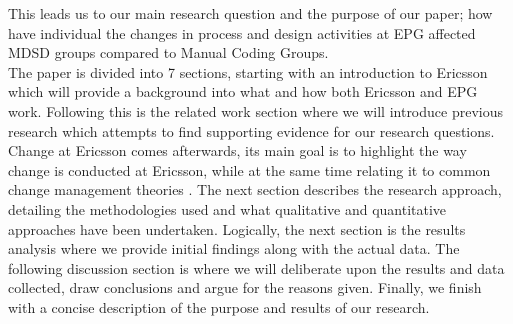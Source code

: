 \documentclass[fina_report_innit.tex]{subfiles}
\begin{document}
This leads us to our main research question and the purpose of our paper; how have individual the changes in process and design activities at EPG affected MDSD groups compared to Manual Coding Groups.
\\

The paper is divided into 7 sections, starting with an introduction to Ericsson which will provide a background into what and how both Ericsson and EPG work. Following this is the related work section where we will introduce previous research which attempts to find supporting evidence for our research questions. Change at Ericsson comes afterwards, its main goal is to highlight the way change is conducted at Ericsson, while at the same time relating it to common change management theories \cite{kotter1995leading} \cite{mintzberg1985strategies}. The next section describes the research approach, detailing the methodologies used and what qualitative and quantitative approaches have been undertaken. Logically, the next section is the results analysis where we provide initial findings along with the actual data. The following discussion section is where we will deliberate upon the results and data collected, draw conclusions and argue for the reasons given. Finally, we finish with a concise description of the purpose and results of our research.
\end{document}
